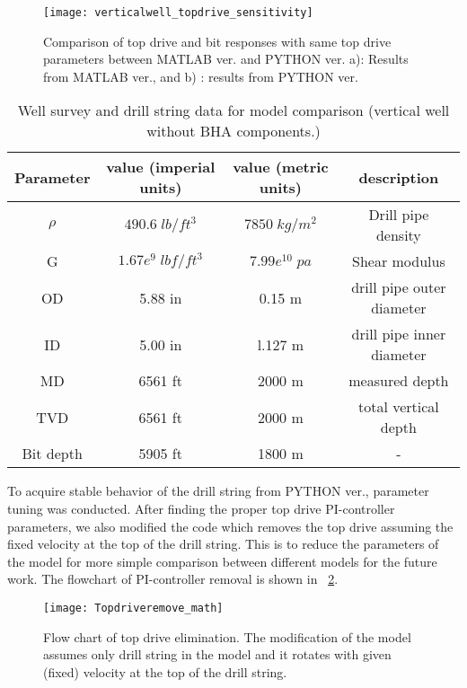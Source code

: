 \begin{figure}[!hbt]
  \centering
  \texttt{[image: verticalwell\_topdrive\_sensitivity]}
  \caption[Comparison of drillstring response to same top drive parameters]{Comparison of top drive and bit responses with same top drive parameters between MATLAB ver. and PYTHON ver. a): Results from MATLAB ver., and b) : results from PYTHON ver.}\label{figure_topdrive_sensitivity}
\end{figure}

\begin{table}[!hbt]
\centering
\begin{tabular}{|c|c|c|c|}
\hline
Parameter & value (imperial units) & value (metric units) & description\\                                                              
\hline
$\rho$ & $490.6\;lb/ft^3$ & $7850\;kg/m^2$ & Drill pipe density \\                                                  
\hline
G & $1.67e^9\;lbf/ft^3$ & $7.99e^{10}\;pa$  & Shear modulus \\                                                  
\hline
OD & 5.88 in & 0.15 m & drill pipe outer diameter\\                                                       
\hline
ID & 5.00 in & l.127 m & drill pipe inner diameter  \\                                                      
\hline
MD & 6561 ft & 2000 m & measured depth\\                                                              
\hline
TVD & 6561 ft & 2000 m & total vertical depth\\
\hline
Bit depth & 5905 ft & 1800 m & - \\ 
\hline
\end{tabular}
\caption[Well survey data for model comparison (vertical well).]{Well survey and drill string data for model comparison (vertical well without BHA components.)}\label{table_topdrivesensitivity_input}
\end{table}

To acquire stable behavior of the drill string from PYTHON ver., parameter tuning was conducted. After finding the proper top drive PI-controller parameters, we also modified the code which removes the top drive assuming the fixed velocity at the top of the drill string. This is to reduce the parameters of the model for more simple comparison between different models for the future work. The flowchart of PI-controller removal is shown in \figurename~\ref{figure_Topdriveremove_math}.
\begin{figure}[!hbt]
  \centering
  \texttt{[image: Topdriveremove\_math]}
  \caption[flow chart of top drive elimination]{Flow chart of top drive elimination. The modification of the model assumes only drill string in the model and it rotates with given (fixed) velocity at the top of the drill string.}\label{figure_Topdriveremove_math}
\end{figure}

